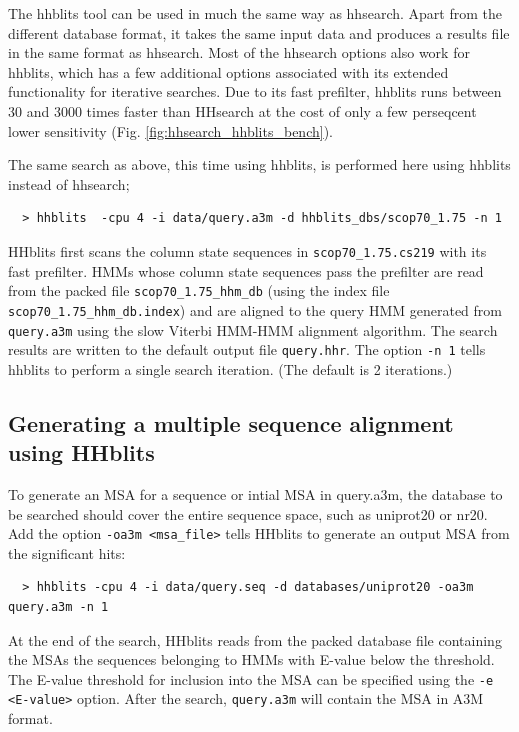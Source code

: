 \documentclass[11pt,a4paper]{article}
\begin{document}
The hhblits tool can be used in much the same way as hhsearch. 
Apart from the different database format, it takes the same input data and produces a results file in 
the same format as hhsearch. Most of the hhsearch options also work for hhblits, which has
a few additional options associated with its extended functionality for iterative searches. 
Due to its fast prefilter, hhblits runs between 30 and 3000 times faster than HHsearch
at the cost of only a few perseqcent lower sensitivity (Fig. \ref{fig:hhsearch_hhblits_bench}).

The same search as above, this time using hhblits, is performed here using hhblits instead of hhsearch;
\begin{verbatim}
  > hhblits  -cpu 4 -i data/query.a3m -d hhblits_dbs/scop70_1.75 -n 1
\end{verbatim}

HHblits first scans the column state sequences in \verb`scop70_1.75.cs219` with its fast prefilter. HMMs whose column state sequences pass the prefilter are read from the packed file \verb`scop70_1.75_hhm_db` (using the index file \verb`scop70_1.75_hhm_db.index`) and are aligned to the query HMM generated from \verb`query.a3m` using the slow Viterbi HMM-HMM alignment algorithm. The search results are written to the default output file \verb`query.hhr`. The option \verb`-n 1` tells hhblits to perform a single search iteration. (The default is 2 iterations.)


\subsection{Generating a multiple sequence alignment using HHblits}\label{msa_hhblits}

To generate an MSA for a sequence or intial MSA in query.a3m, the database to be searched should cover the entire sequence space, such as uniprot20 or nr20. Add the option \verb`-oa3m <msa_file>` tells HHblits to generate an output MSA from the significant hits:
\begin{verbatim}
  > hhblits -cpu 4 -i data/query.seq -d databases/uniprot20 -oa3m query.a3m -n 1
\end{verbatim}

At the end of the search, HHblits reads from the packed database file containing the MSAs the sequences belonging to HMMs with E-value below the threshold. The E-value threshold for inclusion into the MSA can be specified using the \verb`-e <E-value>` option. After the search, \verb`query.a3m` will contain the MSA in A3M format. 
\end{document}

